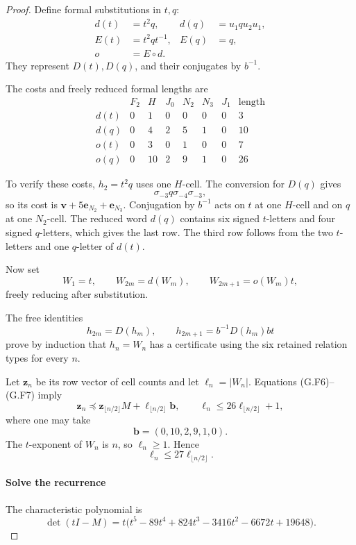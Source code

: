 \begin{proof}
Define formal substitutions in \(t,q\):
\[
\begin{aligned}
d(t)&=t^2q,&d(q)&=u_1qu_2u_1,\\
E(t)&=t^2qt^{-1},&E(q)&=q,\\
o&=E\circ d.
\end{aligned}
\]
They represent \(D(t),D(q)\), and their conjugates by \(b^{-1}\).

The costs and freely reduced formal lengths are
\[
\begin{array}{c|rrrrrr|r}
&F_2&H&J_0&N_2&N_3&J_1&\text{length}\\ \hline
d(t)&0&1&0&0&0&0&3\\
d(q)&0&4&2&5&1&0&10\\
o(t)&0&3&0&1&0&0&7\\
o(q)&0&10&2&9&1&0&26
\end{array} \tag{G.F7}
\]

To verify these costs, \(h_2=t^2q\) uses one \(H\)-cell. The conversion for \(D(q)\) gives
\[
\sigma_{-3}q\sigma_{-4}\sigma_{-3},
\]
so its cost is \(\mathbf v+5\mathbf e_{N_2}+\mathbf e_{N_3}\). Conjugation by \(b^{-1}\) acts on \(t\) at one \(H\)-cell and on \(q\) at one \(N_2\)-cell. The reduced word \(d(q)\) contains six signed \(t\)-letters and four signed \(q\)-letters, which gives the last row. The third row follows from the two \(t\)-letters and one \(q\)-letter of \(d(t)\).

Now set
\[
W_1=t,\qquad
W_{2m}=d(W_m),\qquad
W_{2m+1}=o(W_m)t,
\]
freely reducing after substitution.

The free identities
\[
h_{2m}=D(h_m),\qquad
h_{2m+1}=b^{-1}D(h_m)bt
\]
prove by induction that \(h_n=W_n\) has a certificate using the six retained relation types for every \(n\).

Let \(\mathbf z_n\) be its row vector of cell counts and let \(\ell_n=|W_n|\). Equations (G.F6)--(G.F7) imply
\[
\mathbf z_n\preceq
\mathbf z_{\lfloor n/2\rfloor}M
+\ell_{\lfloor n/2\rfloor}\mathbf b,
\qquad
\ell_n\le26\ell_{\lfloor n/2\rfloor}+1,
\tag{G.F8}
\]
where one may take
\[
\mathbf b=(0,10,2,9,1,0).
\]
The \(t\)-exponent of \(W_n\) is \(n\), so \(\ell_n\ge1\). Hence
\[
\ell_n\le27\ell_{\lfloor n/2\rfloor}.
\]

\paragraph{Solve the recurrence}

The characteristic polynomial is
\[
\det(tI-M)
=t\bigl(t^5-89t^4+824t^3-3416t^2-6672t+19648\bigr).
\]


\end{proof}
